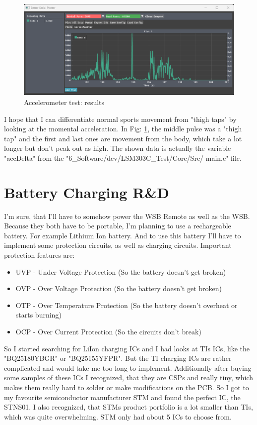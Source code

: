 \begin{figure}[H]
	\centering
	\includegraphics[width=17cm]{Resources/accTestMeas.png}
	\caption{Accelerometer test: results}
	\label{fig:accTestMeas}
\end{figure}

I hope that I can differentiate normal sports movement from "thigh taps" by looking at the momental acceleration. In Fig: \ref{fig:accTestMeas}, the middle pulse was a "thigh tap" and the first and last ones are movement from the body, which take a lot longer but don't peak out as high. The shown data is actually the variable "accDelta" from the "6\_Software/dev/LSM303C\_Test/Core/Src/ main.c" file.

\section{Battery Charging R\&D}
\label{sec:Battery Charging}
I'm sure, that I'll have to somehow power the WSB Remote as well as the WSB. Because they both have to be portable, I'm planning to use a rechargeable battery. For example Lithium Ion battery. And to use this battery I'll have to implement some protection circuits, as well as charging circuits. Important protection features are:
\begin{itemize}
    \item UVP - Under Voltage Protection (So the battery doesn't get broken)
    \item OVP - Over Voltage Protection (So the battery doesn't get broken)
    \item OTP - Over Temperature Protection (So the battery doesn't overheat or starts burning)
    \item OCP - Over Current Protection (So the circuits don't break)
\end{itemize}

So I started searching for LiIon charging ICs and I had looks at TIs ICs, like the "BQ25180YBGR" or "BQ25155YFPR". But the TI charging ICs are rather complicated and would take me too long to implement. Additionally after buying some samples of these ICs I recognized, that they are CSPs and really tiny, which makes them really hard to solder or make modifications on the PCB. So I got to my favourite semiconductor manufacturer STM and found the perfect IC, the STNS01. I also recognized, that STMs product portfolio is a lot smaller than TIs, which was quite overwhelming. STM only had about 5 ICs to choose from.
